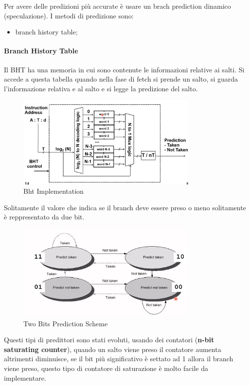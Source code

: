 \documentclass[12pt]{article}
\begin{document}
Per avere delle predizioni pi\`u accurate \`e usare un brach prediction dinamico (speculazione). I metodi di predizione sono:
\begin{itemize}
    \item branch history table;
\end{itemize}

\paragraph{Branch History Table}
Il BHT ha una memoria in cui sono contenute le informazioni relative ai salti. Si accede a questa tabella quando nella fase di fetch si prende un salto, si guarda l'informazione relativa e al salto e si legge la predizione del salto.
\begin{figure}[H]
    \centering
    \includegraphics[width=0.8\textwidth]{bht-implementation.png}
    \caption{Bht Implementation}
    \label{fig:bht-implementation}
\end{figure}
Solitamente il valore che indica se il branch deve essere preso o meno solitamente \`e reppresentato da due bit.
\begin{figure}[H]
    \centering
    \includegraphics[width=0.8\textwidth]{two-bits-prediction-scheme.png}
    \caption{Two Bits Prediction Scheme}
    \label{fig:two-bits-prediction-scheme}
\end{figure}
Questi tipi di predittori sono stati evoluti, usando dei contatori (\textbf{n-bit saturating counter}), quando un salto viene preso il contatore aumenta altrimenti diminuisce, se il bit pi\`u significativo \`e settato ad 1 allora il branch viene preso, questo tipo di contatore di saturazione \`e molto facile da implementare.
\end{document}
